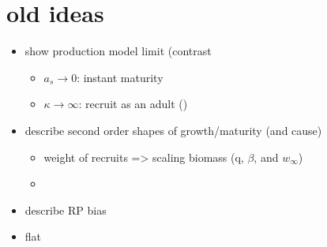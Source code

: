 %
\section{old ideas}

%
\begin{itemize}
\item show production model limit (contrast %
\begin{itemize}
        \item $a_s\rightarrow0$: instant maturity
        \item $\kappa\rightarrow\infty$: recruit as an adult ()
\end{itemize}
\item describe second order shapes of growth/maturity (and cause)
\begin{itemize}
        \item weight of recruits => scaling biomass (q, $\beta$, and $w_\infty$)
        \item
\end{itemize}
\item describe RP bias
\item flat
\end{itemize}


